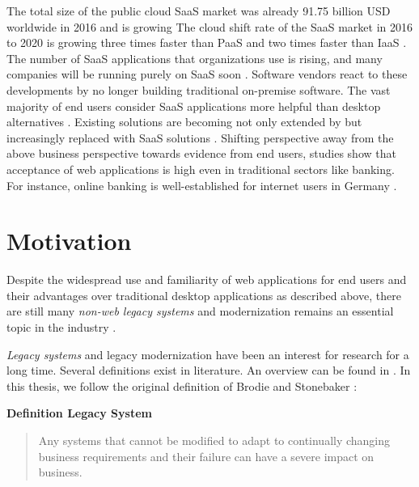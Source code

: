The total size of the public cloud SaaS market was already 91.75 billion USD worldwide in 2016 \autocite{Statista2018SaaSMarketSize} and is growing \autocite{Statista2018SaaSMarketSize,BetterCloud2017SaaSWorkplace,Chan2018SaaSStatistics}
The cloud shift rate of the SaaS market in 2016 to 2020 is growing three times faster than PaaS and two times faster than IaaS \autocite{BetterCloud2017SaaSWorkplace}.
The number of SaaS applications that organizations use is rising, and many companies will be running purely on SaaS soon \autocite{BetterCloud2017SaaSWorkplace}.
Software vendors react to these developments by no longer building traditional on-premise software.
The vast majority of end users consider SaaS applications more helpful than desktop alternatives \autocite{BetterCloud2017SaaSWorkplace}.
Existing solutions are becoming not only extended by but increasingly replaced with SaaS solutions \autocite{Gartner2012SaaSSurvey}.
Shifting perspective away from the above business perspective towards evidence from end users, studies show that acceptance of web applications is high even in traditional sectors like banking.
For instance, online banking is well-established for internet users in Germany \autocite{BitkomResearch2016DigitalBanking}.

\hypertarget{motivation}{%
\section{Motivation}\label{motivation}}

Despite the widespread use and familiarity of web applications for end users and their advantages over traditional desktop applications as described above, there are still many \emph{non-web legacy systems} and modernization remains an essential topic in the industry \autocite{Batlajery2014IndustrialSurveyModernization,Khadka2014ProfessionalsModernization,Gartner2013CIOAgenda,Gartner2013Priorities,NASCIO2016,ForresterResearch2011Modernization}.

\emph{Legacy systems} and legacy modernization have been an interest for research for a long time.
Several definitions exist in literature.
An overview can be found in \autocite{Wagner2014Fundamentals}.
In this thesis, we follow the original definition of Brodie and Stonebaker \autocite{Brodie1995Migrating}:

\textbf{Definition Legacy System \autocite{Brodie1995Migrating}}

\begin{quote}
Any systems that cannot be modified to adapt to continually changing business requirements and their failure can have a severe impact on business.
\end{quote}

